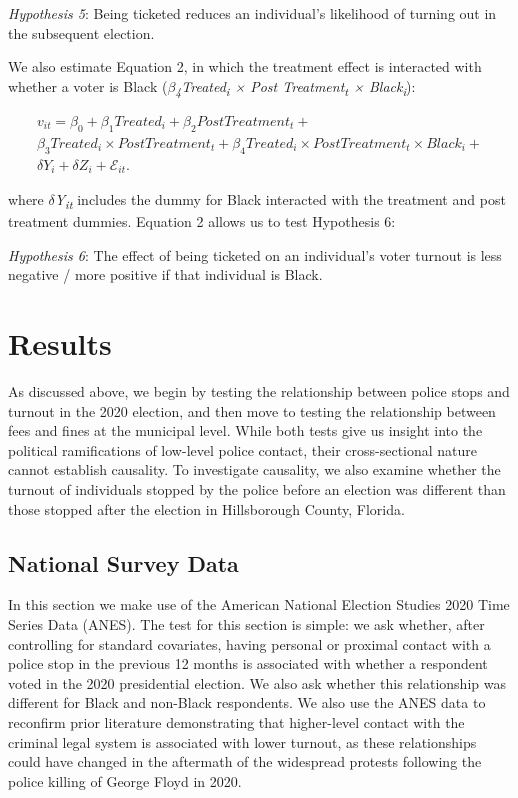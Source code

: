 \documentclass[
  12pt,
]{article}
\begin{document}
\emph{Hypothesis 5}: Being ticketed reduces an individual's likelihood of turning out in the subsequent election.

We also estimate Equation 2, in which the treatment effect is interacted with whether a voter is Black (\emph{\(\beta\)\textsubscript{4}Treated\textsubscript{i} × Post Treatment\textsubscript{t} × Black\textsubscript{i}}):

\begin{gather}
\label{eq:2}
v_{it}=\beta_0+\beta_1Treated_{i}+\beta_2Post Treatment_{t} + \nonumber \\
\beta_3Treated_{i}\times Post Treatment_{t} + \beta_4Treated_{i}\times Post Treatment_{t}\times Black_{i} +\\
\delta{Y}_{i} + \delta{Z}_{i} + \mathcal{E}_{it}. \nonumber
\end{gather}

where \emph{\(\delta\)Y\textsubscript{it}} includes the dummy for Black interacted with the treatment and post treatment dummies. Equation 2 allows us to test Hypothesis 6:

\emph{Hypothesis 6}: The effect of being ticketed on an individual's voter turnout is less negative / more positive if that individual is Black.

\hypertarget{results}{%
\section*{Results}\label{results}}

As discussed above, we begin by testing the relationship between police stops and turnout in the 2020 election, and then move to testing the relationship between fees and fines at the municipal level. While both tests give us insight into the political ramifications of low-level police contact, their cross-sectional nature cannot establish causality. To investigate causality, we also examine whether the turnout of individuals stopped by the police before an election was different than those stopped after the election in Hillsborough County, Florida.

\hypertarget{national-survey-data-1}{%
\subsection*{National Survey Data}\label{national-survey-data-1}}

In this section we make use of the American National Election Studies 2020 Time Series Data (ANES). The test for this section is simple: we ask whether, after controlling for standard covariates, having personal or proximal contact with a police stop in the previous 12 months is associated with whether a respondent voted in the 2020 presidential election. We also ask whether this relationship was different for Black and non-Black respondents. We also use the ANES data to reconfirm prior literature demonstrating that higher-level contact with the criminal legal system is associated with lower turnout, as these relationships could have changed in the aftermath of the widespread protests following the police killing of George Floyd in 2020.
\end{document}
